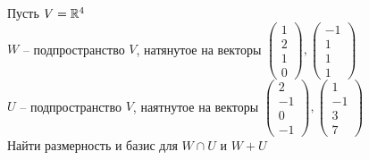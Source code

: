 Пусть $ V = \mathbb{R}^4 $ \\
$ W $ -- подпространство $ V $, натянутое на векторы $
\begin{pmatrix}
	1 \\
    2 \\
    1 \\
    0
\end{pmatrix},
\begin{pmatrix}
	-1 \\
    1 \\
    1 \\
    1
\end{pmatrix} $ \\
$ U $ -- подпространство $ V $, наятнутое на векторы $
\begin{pmatrix}
	2 \\
    -1 \\
    0 \\
    -1
\end{pmatrix},
\begin{pmatrix}
	1 \\
    -1 \\
    3 \\
    7
\end{pmatrix} $ \\
Найти размерность и базис для $ W \cap U $ и $ W + U $
